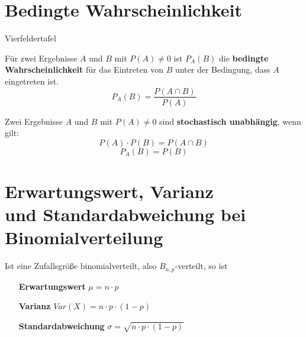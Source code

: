\documentclass[10pt]{article}
\begin{document}
\section{Bedingte Wahrscheinlichkeit}
\begin{margintable}
\centering
{}
\caption{Vierfeldertafel}
\end{margintable}


\begin{definition}
	Für zwei Ergebnisse $A$ und $B$ mit $P(A)\neq 0$ ist $P_A(B)$ die \textbf{bedingte Wahrscheinlichkeit} für das Eintreten von $B$ unter der Bedingung, dass $A$ eingetreten ist.
	\[
	P_A(B)=\frac{P(A\cap B)}{P(A)}
	\]
\end{definition}
\begin{definition}
	Zwei Ergebnisse $A$ und $B$ mit $P(A)\neq 0$ sind \textbf{stochastisch unabhängig}, wenn gilt:
	\[
	P(A)\cdot P(B)=P(A\cap B)
	\]
	\[
	P_A(B)=P(B)
	\]
\end{definition}

\section{Erwartungswert, Varianz\\ und Standardabweichung bei Binomialverteilung}
\begin{definition}
Ist eine Zufallsgröße binomialverteilt, also $B_{n,p}$-verteilt, so ist
	\begin{itemize}[leftmargin=6pt+]
	\item[\bfseries Erwartungswert] $\mu = n\cdot p$
	\item[\bfseries Varianz] $Var(X)=n\cdot p\cdot (1-p)$
	\item[\bfseries Standardabweichung] $\sigma=\sqrt{n\cdot p\cdot (1-p)}$
	\end{itemize}
\end{definition}

\newpage
\end{document}
